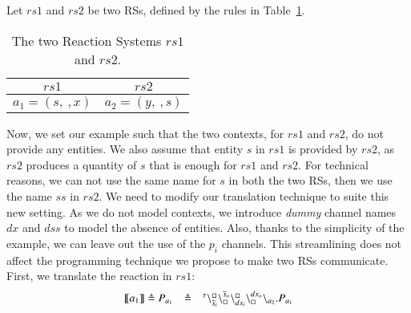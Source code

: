 \begin{example}
\label{ex:twoRS}
Let  $rs1$ and $rs2$ be two RSs, defined by the rules in Table~\ref{tab:rules}.


\begin{table}[t]
\centering
\begin{tabular}{|c|c|}
\hline
$rs1$  & $rs2$ \\
\hline
$a_1=(s,\ , x)$ & $a_2=(y,\  ,s)$\\
\hline 
\end{tabular}
\caption{The two Reaction Systems $rs1$ and $rs2$.}
\label{tab:rules}
\end{table}
 \noindent
Now, we set our example such that the two contexts, for  $rs1$ and $rs2$, do not provide any entities.
We also assume that entity $s$ in $rs1$ is provided by $rs2$, as $rs2$ produces a quantity of $s$ that is enough for $rs1$ and $rs2$.
For technical reasons, we can not use the same name for  $s$ in both the two RSs, then we use the name $ss$ in $rs2$.
%
We need to modify our translation technique to suite this new setting. 
As we do not model contexts, we introduce  \emph{dummy} channel names $dx$ and $dss$ to model the absence of entities. Also, thanks to the simplicity of the example, we can leave out the use of the   $p_i$ channels. This streamlining does not affect the programming technique we propose to make two RSs communicate.
First, we translate the reaction in $rs1$:
\[
\begin{array}{lcl}
\llbracket a_1\rrbracket \defeq P_{a_1}&\defeq &
\startchain{\silent}\chainedlink{\overline{s}_i}{\noact}\chainedlink{\noact}{\overline{s}_o}    \chainedlink{dx_i}{\noact}\chainedlink{\noact}{dx_o}\chainend{a_2}.P_{a_1}\\
%
\end{array}
\]


\end{example}
